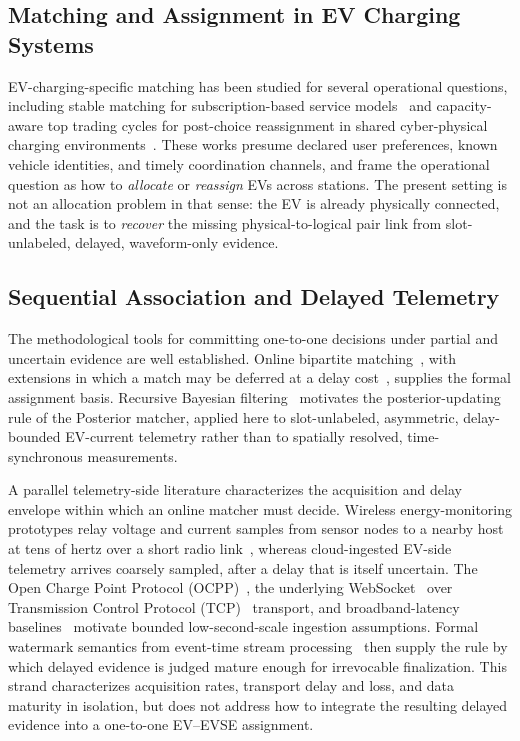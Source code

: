 \documentclass{ieeeaccess}
\newif\ifhighlight \highlightfalse
\DeclareRobustCommand{\revised}[1]{\ifhighlight{\color{blue}#1}\else{\color{.}#1}\fi}
\begin{document}
    \subsection{Matching and Assignment in EV Charging Systems}
    EV-charging-specific matching has been studied for several operational questions, including stable matching for subscription-based service models~\cite{bkhanda} and capacity-aware top trading cycles for post-choice reassignment in shared cyber-physical charging environments~\cite{breactttc}.
    These works presume declared user preferences, known vehicle identities, and timely coordination channels, and frame the operational question as how to \emph{allocate} or \emph{reassign} EVs across stations.
    The present setting is not an allocation problem in that sense: the EV is already physically connected, and the task is to \emph{recover} the missing physical-to-logical pair link from \revised{slot-unlabeled}, delayed, waveform-only evidence.

    \subsection{Sequential Association and Delayed Telemetry}
    The methodological tools for committing one-to-one decisions under partial and uncertain evidence are well established.
    Online bipartite matching~\cite{b17,b18}, \revised{with extensions in which a match may be deferred at a delay cost~\cite{bemek16}}, supplies the formal assignment basis.
    Recursive Bayesian filtering~\cite{b19,bsarkka} motivates the posterior-updating \revised{rule of the Posterior matcher}, applied here to \revised{slot-unlabeled}, asymmetric, delay-bounded EV-current telemetry rather than to spatially resolved, time-synchronous measurements.

    A parallel telemetry-side literature characterizes the \revised{acquisition and} delay envelope within which an online matcher must decide.
    \revised{Wireless energy-monitoring prototypes relay voltage and current samples from sensor nodes to a nearby host at tens of hertz over a short radio link~\cite{bsabry17}, whereas cloud-ingested EV-side telemetry arrives coarsely sampled, after a delay that is itself uncertain.}
    The Open Charge Point Protocol (OCPP)~\cite{b22}, the underlying WebSocket~\cite{b23} over Transmission Control Protocol (TCP)~\cite{b24} transport, and broadband-latency baselines~\cite{b25} motivate bounded low-second-scale ingestion assumptions.
    Formal watermark semantics from event-time stream processing~\cite{b26} then supply the rule by which delayed evidence is judged mature enough for irrevocable finalization.
    \revised{This strand characterizes acquisition rates, transport delay and loss, and data maturity in isolation}, but does not address how to integrate the resulting delayed evidence into a \revised{one-to-one EV--EVSE assignment}.
\end{document}
